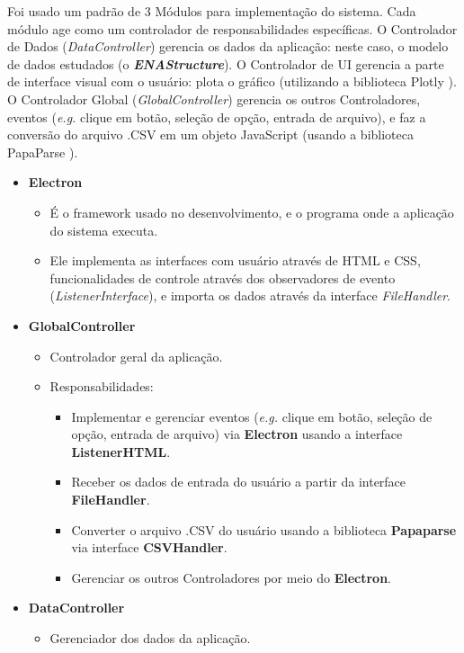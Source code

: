 \documentclass[12pt]{article}
\begin{document}
Foi usado um padrão de 3 Módulos para implementação do sistema. Cada módulo age como um
controlador de responsabilidades específicas.
O Controlador de Dados (\textit{DataController}) gerencia os dados da aplicação: 
neste caso, o modelo de dados estudados (o \textbf{\textit{ENAStructure}}).
O Controlador de UI gerencia a parte de interface visual com o usuário: plota o gráfico
(utilizando a biblioteca Plotly \cite{Plotly}).
O Controlador Global (\textit{GlobalController}) gerencia os outros Controladores,
eventos (\textit{e.g.} clique em botão, seleção de opção, entrada de arquivo), e faz
a conversão do arquivo .CSV em um objeto JavaScript (usando a biblioteca
PapaParse \cite{PapaParse}).

\begin{itemize}
	\item \textbf{Electron}
	\begin{itemize}
		\item É o framework usado no desenvolvimento, e o programa onde a aplicação do sistema executa.
		\item Ele implementa as interfaces com usuário através de HTML e CSS, funcionalidades de controle através dos observadores de evento (\textit{ListenerInterface}), e importa os dados através da interface \textit{FileHandler}.
	\end{itemize}
	\item \textbf{GlobalController}
	\begin{itemize}
		\item Controlador geral da aplicação.
		\item Responsabilidades:
		\begin{itemize}
			\item Implementar e gerenciar eventos (\textit{e.g.} clique em botão, seleção de opção, entrada de arquivo) via \textbf{Electron} usando a interface \textbf{ListenerHTML}.
			\item Receber os dados de entrada do usuário a partir da interface \textbf{FileHandler}.
			\item Converter o arquivo .CSV do usuário usando a biblioteca \textbf{Papaparse} via interface \textbf{CSVHandler}.
			\item Gerenciar os outros Controladores por meio do \textbf{Electron}.
		\end{itemize}
	\end{itemize}
	\item \textbf{DataController}
	\begin{itemize}
		\item Gerenciador dos dados da aplicação.

\end{itemize}
\end{itemize}
\end{document}
